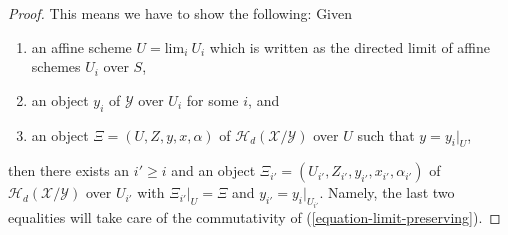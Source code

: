 \begin{proof}
This means we have to show the following: Given
\begin{enumerate}
\item an affine scheme $U = \text{lim}_i\ U_i$ which is written as the
directed limit of affine schemes $U_i$ over $S$,
\item an object $y_i$ of $\mathcal{Y}$ over $U_i$ for some $i$, and
\item an object $\Xi = (U, Z, y, x, \alpha)$ of
$\mathcal{H}_d(\mathcal{X}/\mathcal{Y})$
over $U$ such that $y = y_i|_U$,
\end{enumerate}
then there exists an $i' \geq i$ and an object
$\Xi_{i'} = (U_{i'}, Z_{i'}, y_{i'}, x_{i'}, \alpha_{i'})$ of
$\mathcal{H}_d(\mathcal{X}/\mathcal{Y})$ over $U_{i'}$ with
$\Xi_{i'}|_U = \Xi$ and $y_{i'} = y_i|_{U_{i'}}$.
Namely, the last two equalities will take care of the commutativity of
(\ref{equation-limit-preserving}).


\end{proof}
